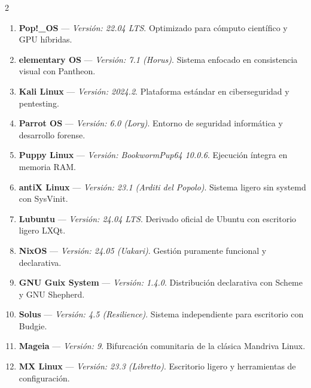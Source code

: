 \documentclass[12pt]{article}
\begin{document}
\begin{multicols}{2}
\begin{enumerate}[label=\textbf{\arabic*.}, leftmargin=*, noitemsep, topsep=1pt, start=27]
    \item \textbf{Pop!\_OS} --- \textit{Versión: 22.04 LTS}. Optimizado para cómputo científico y GPU híbridas.
    \item \textbf{elementary OS} --- \textit{Versión: 7.1 (Horus)}. Sistema enfocado en consistencia visual con Pantheon.
    \item \textbf{Kali Linux} --- \textit{Versión: 2024.2}. Plataforma estándar en ciberseguridad y pentesting.
    \item \textbf{Parrot OS} --- \textit{Versión: 6.0 (Lory)}. Entorno de seguridad informática y desarrollo forense.
    \item \textbf{Puppy Linux} --- \textit{Versión: BookwormPup64 10.0.6}. Ejecución íntegra en memoria RAM.
    \item \textbf{antiX Linux} --- \textit{Versión: 23.1 (Arditi del Popolo)}. Sistema ligero sin systemd con SysVinit.
    \item \textbf{Lubuntu} --- \textit{Versión: 24.04 LTS}. Derivado oficial de Ubuntu con escritorio ligero LXQt.
    \item \textbf{NixOS} --- \textit{Versión: 24.05 (Uakari)}. Gestión puramente funcional y declarativa.
    \item \textbf{GNU Guix System} --- \textit{Versión: 1.4.0}. Distribución declarativa con Scheme y GNU Shepherd.
    \item \textbf{Solus} --- \textit{Versión: 4.5 (Resilience)}. Sistema independiente para escritorio con Budgie.
    \item \textbf{Mageia} --- \textit{Versión: 9}. Bifurcación comunitaria de la clásica Mandriva Linux.
    \item \textbf{MX Linux} --- \textit{Versión: 23.3 (Libretto)}. Escritorio ligero y herramientas de configuración.
\end{enumerate}


\end{multicols}
\end{document}
